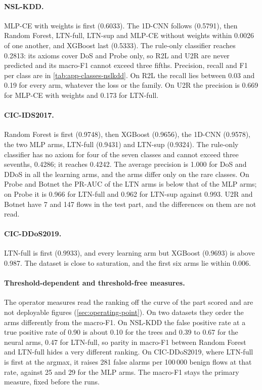 \paragraph{NSL-KDD.}
MLP-CE with weights is first (0.6033). The 1D-CNN follows (0.5791), then Random Forest, LTN-full,
LTN-sup and MLP-CE without weights within 0.0026 of one another, and XGBoost last (0.5333). The
rule-only classifier reaches 0.2813: its axioms cover DoS and Probe only, so R2L and U2R are never
predicted and its macro-F1 cannot exceed three fifths. Precision, recall and F1 per class are in \cref{tab:app-classes-nslkdd}. On
R2L the recall lies between 0.03 and 0.19 for every arm, whatever the loss or the family. On U2R the precision is
0.669 for MLP-CE with weights and 0.173 for LTN-full.

\paragraph{CIC-IDS2017.}
Random Forest is first (0.9748), then XGBoost (0.9656), the 1D-CNN (0.9578), the two MLP arms, LTN-full
(0.9431) and LTN-sup (0.9324). The rule-only classifier has no axiom for four of the seven classes and
cannot exceed three sevenths, 0.4286; it reaches 0.4242. The average precision is 1.000 for DoS and DDoS
in all the learning arms, and the arms differ only on the rare classes. On Probe and Botnet the PR-AUC
of the LTN arms is below that of the MLP arms; on Probe it is 0.966 for LTN-full and 0.962 for LTN-sup against 0.993. U2R and Botnet
have 7 and 147 flows in the test part, and the differences on them are not read.

\paragraph{CIC-DDoS2019.}
LTN-full is first (0.9933), and every learning arm but XGBoost (0.9693) is above 0.987. The dataset is
close to saturation, and the first six arms lie within 0.006.

\paragraph{Threshold-dependent and threshold-free measures.}
The operator measures read the ranking off the curve of the part scored and are not deployable figures
(\cref{sec:operating-point}). On two datasets they order the arms differently from the macro-F1. On NSL-KDD the false
positive rate at a true positive rate of 0.90 is about 0.10 for the trees and 0.39 to 0.67 for the neural arms, 0.47 for
LTN-full, so parity in macro-F1 between Random Forest and LTN-full hides a very different ranking. On CIC-DDoS2019, where
LTN-full is first at the argmax, it raises 281 false alarms per 100\,000 benign flows at that rate, against 25 and 29 for
the MLP arms. The macro-F1 stays the primary measure, fixed before the runs.

